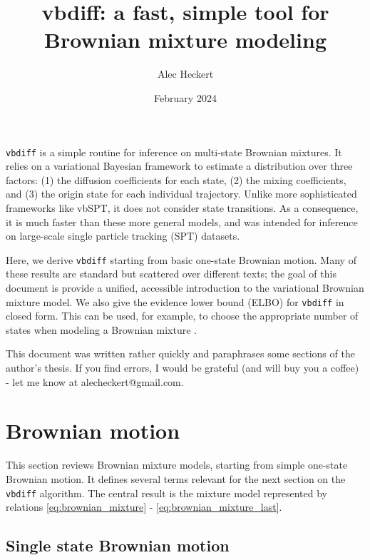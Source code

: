 \documentclass{article}
\begin{document}
\title{vbdiff: a fast, simple tool for Brownian mixture modeling}
\date{February 2024}
\author{Alec Heckert}
\maketitle

\verb|vbdiff| is a simple routine for inference on multi-state Brownian
mixtures. It relies on a variational Bayesian framework to estimate a distribution
over three factors: (1) the diffusion coefficients for each state, (2) the mixing
coefficients, and (3) the origin state for each individual trajectory.
Unlike more sophisticated frameworks like vbSPT, it does not consider state transitions.
As a consequence, it is much faster than these more general models,
and was intended for inference on large-scale single particle tracking
(SPT) datasets. \newline

Here, we derive \verb|vbdiff| starting from basic one-state Brownian motion. Many of these results are standard but scattered over different texts; the goal
of this document is provide a unified, accessible introduction to the variational
Brownian mixture model. We also give the evidence lower bound (ELBO) for
\verb|vbdiff| in closed form. This can be used, for example, to choose the
appropriate number of states when modeling a Brownian mixture \cite{bishop2001}. \newline

This document was written rather quickly and paraphrases some
sections of the author's thesis. If you find errors, I would be
grateful (and will buy you a coffee) - let me know at
alecheckert@gmail.com.

\tableofcontents

\section{Brownian motion}\label{section:brownian_motion}

This section reviews Brownian mixture models, starting from
simple one-state Brownian motion. It defines several terms
relevant for the next section on the \verb|vbdiff| algorithm.
The central result is the mixture model represented by relations
\ref{eq:brownian_mixture} - \ref{eq:brownian_mixture_last}.

\subsection{Single state Brownian motion}
\end{document}
